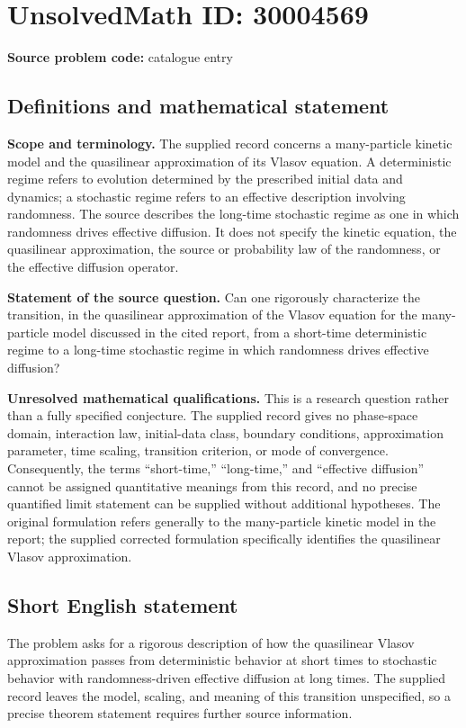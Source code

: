 \documentclass[11pt]{article}
\begin{document}
\section*{UnsolvedMath ID: 30004569}
\textbf{Source problem code:} catalogue entry
\subsection{Definitions and mathematical statement}
\textbf{Scope and terminology.} The supplied record concerns a many-particle kinetic model and the quasilinear approximation of its Vlasov equation. A deterministic regime refers to evolution determined by the prescribed initial data and dynamics; a stochastic regime refers to an effective description involving randomness. The source describes the long-time stochastic regime as one in which randomness drives effective diffusion. It does not specify the kinetic equation, the quasilinear approximation, the source or probability law of the randomness, or the effective diffusion operator.

\textbf{Statement of the source question.} Can one rigorously characterize the transition, in the quasilinear approximation of the Vlasov equation for the many-particle model discussed in the cited report, from a short-time deterministic regime to a long-time stochastic regime in which randomness drives effective diffusion?

\textbf{Unresolved mathematical qualifications.} This is a research question rather than a fully specified conjecture. The supplied record gives no phase-space domain, interaction law, initial-data class, boundary conditions, approximation parameter, time scaling, transition criterion, or mode of convergence. Consequently, the terms ``short-time,'' ``long-time,'' and ``effective diffusion'' cannot be assigned quantitative meanings from this record, and no precise quantified limit statement can be supplied without additional hypotheses. The original formulation refers generally to the many-particle kinetic model in the report; the supplied corrected formulation specifically identifies the quasilinear Vlasov approximation.
\subsection{Short English statement}
The problem asks for a rigorous description of how the quasilinear Vlasov approximation passes from deterministic behavior at short times to stochastic behavior with randomness-driven effective diffusion at long times. The supplied record leaves the model, scaling, and meaning of this transition unspecified, so a precise theorem statement requires further source information.
\end{document}
